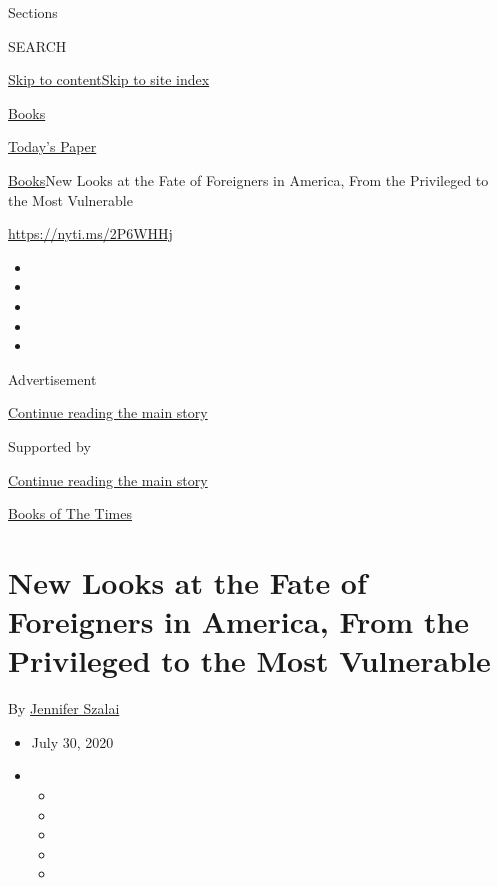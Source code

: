 Sections

SEARCH

\protect\hyperlink{site-content}{Skip to
content}\protect\hyperlink{site-index}{Skip to site index}

\href{https://www.nytimes3xbfgragh.onion/section/books}{Books}

\href{https://myaccount.nytimes3xbfgragh.onion/auth/login?response_type=cookie\&client_id=vi}{}

\href{https://www.nytimes3xbfgragh.onion/section/todayspaper}{Today's
Paper}

\href{/section/books}{Books}\textbar{}New Looks at the Fate of
Foreigners in America, From the Privileged to the Most Vulnerable

\url{https://nyti.ms/2P6WHHj}

\begin{itemize}
\item
\item
\item
\item
\item
\end{itemize}

Advertisement

\protect\hyperlink{after-top}{Continue reading the main story}

Supported by

\protect\hyperlink{after-sponsor}{Continue reading the main story}

\href{/column/books-of-the-times}{Books of The Times}

\hypertarget{new-looks-at-the-fate-of-foreigners-in-america-from-the-privileged-to-the-most-vulnerable}{%
\section{New Looks at the Fate of Foreigners in America, From the
Privileged to the Most
Vulnerable}\label{new-looks-at-the-fate-of-foreigners-in-america-from-the-privileged-to-the-most-vulnerable}}

By \href{https://www.nytimes3xbfgragh.onion/by/jennifer-szalai}{Jennifer
Szalai}

\begin{itemize}
\item
  July 30, 2020
\item
  \begin{itemize}
  \item
  \item
  \item
  \item
  \item
  \end{itemize}
\end{itemize}

